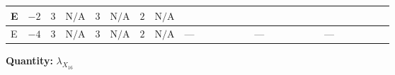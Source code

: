 \documentclass[8pt]{article}
\begin{document}
\begin{landscape}
\begin{longtable}{@{}llcccccc >{\raggedright\arraybackslash}p{0.21\linewidth} >{\raggedright\arraybackslash}p{0.21\linewidth} >{\raggedright\arraybackslash}p{0.21\linewidth}@{}}
E & $-2$ & $3$ & $\text{N/A}$ & $3$ & $\text{N/A}$ & $2$ & $\text{N/A}$ & \scriptsize\adjustbox{max width=\linewidth}{$\begin{gathered} {\lambda_{X_{16}}} (6 \operatorname{Tr}\!\left({Y_d}\,\left({Y_d}\right)^{\dagger}\right)+2 \operatorname{Tr}\!\left({Y_e}\,\left({Y_e}\right)^{\dagger}\right)+6 \operatorname{Tr}\!\left({Y_u}\,\left({Y_u}\right)^{\dagger}\right))\end{gathered}$} & \scriptsize\adjustbox{max width=\linewidth}{$\begin{gathered} +40 {\lambda_{X_{1}}} \left({\lambda_{X_{16}}}\right)^{*}\end{gathered}$} & \scriptsize\adjustbox{max width=\linewidth}{$\begin{gathered} -\frac{33 {g_2}^2 {\lambda_{X_{16}}}}{2}\end{gathered}$} \\
\midrule
E & $-4$ & $3$ & $\text{N/A}$ & $3$ & $\text{N/A}$ & $2$ & $\text{N/A}$ & --- & --- & --- \\
\midrule
\bottomrule
\end{longtable}
\clearpage
\noindent\textbf{Quantity: }${\lambda_{X_{16}}}$\par\smallskip

\end{landscape}
\end{document}
